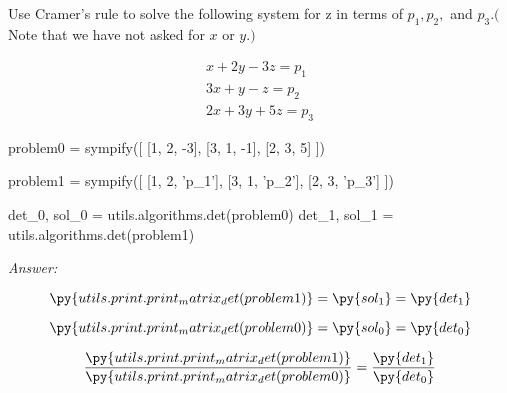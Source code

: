 \documentclass[letterpaper]{article}
\newcommand{\ans}{\textit{Answer: }}
\newenvironment{question}[2][Question]{\begin{trivlist}
\item[\hskip \labelsep {\bfseries #1}\hskip \labelsep {\bfseries #2.}]}{\end{trivlist}}
\begin{document}
\begin{question}{4.36}
  Use Cramer's rule to solve the following system for z in terms of $p_{1}, p_{2},$ and
  $p_{3} .($ Note that we have not asked for $x$ or $y .) $

  $$
  \begin{array}{c}{x+2 y-3 z=p_{1}} \\ {3 x+y-z=p_{2}} \\ {2 x+3 y+5 z=p_{3}}\end{array}
  $$

  \begin{pycode}
problem0 = sympify([
  [1, 2, -3],
  [3, 1, -1],
  [2, 3, 5]
])

problem1 = sympify([
  [1, 2, 'p_1'],
  [3, 1, 'p_2'],
  [2, 3, 'p_3']
])

det_0, sol_0 = utils.algorithms.det(problem0)
det_1, sol_1 = utils.algorithms.det(problem1)
  \end{pycode}

  \ans 

  $$\py{utils.print.print_matrix_det(problem1)} = \py{sol_1} = \py{det_1}$$

  $$\py{utils.print.print_matrix_det(problem0)} = \py{sol_0} = \py{det_0}$$

  $$\frac{
    \py{utils.print.print_matrix_det(problem1)}
    }{
    \py{utils.print.print_matrix_det(problem0)}
    } = \frac{\py{det_1}}{\py{det_0}}$$
\end{question}
\end{document}
